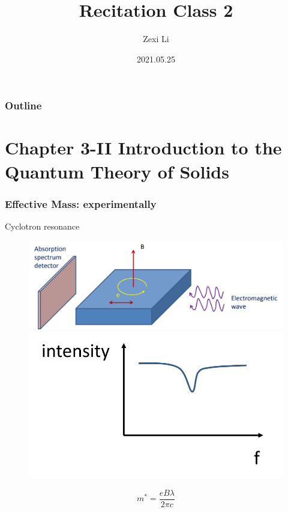 \documentclass{beamer}
\begin{document}
\renewcommand{\d}{\: \mathrm{d} }
\newcommand{\e}{\mathrm{e}}


\title[] {Recitation Class 2}

\author[lzx]{Zexi Li}


\date{2021.05.25}

\frame{\titlepage}


\begin{frame}
    \frametitle{Outline}
    \tableofcontents
\end{frame}


\section{Chapter 3-II Introduction to the Quantum Theory of Solids}
    \begin{frame} \frametitle{Effective Mass: experimentally}
        Cyclotron resonance
        \begin{figure}[H]
            \centering
            \includegraphics[width=0.6\linewidth]{Effective-mass-experiment.jpg}
            \includegraphics[width=0.3\linewidth]{Effective-mass-experiment-graph.jpg}
            \label{fig:Effective-mass-experiment.jpg}
        \end{figure}
        \begin{equation*}
            \boxed{m^* = \frac{eB\lambda}{2\pi c} }
        \end{equation*}
    \end{frame}
\end{document}
